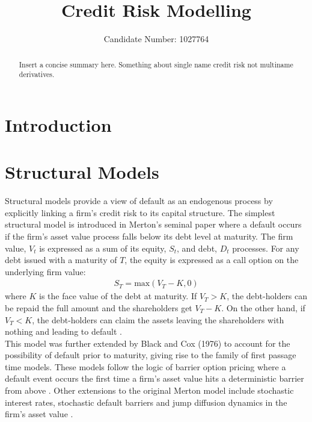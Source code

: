 \documentclass[11t,a4paper]{article}
\title{Credit Risk Modelling}
\author{Candidate Number: 1027764}
\begin{document}
\maketitle

\thispagestyle{empty}

\newpage
\tableofcontents
\thispagestyle{empty}
\newpage

\begin{abstract}
  Insert a concise summary here. Something about single name credit risk not multiname derivatives.
\end{abstract}
\newpage
\setcounter{page}{1}

\section{Introduction}
\section{Structural Models}
Structural models provide a view of default as an endogenous process by explicitly linking a firm's credit risk to its capital structure. The simplest structural model is introduced in Merton's seminal paper where a default occurs if the firm's asset value process falls below its debt level at maturity. The firm value, $V_t$ is expressed as a sum of its equity, $S_t$, and debt, $D_t$ processes. For any debt issued with a maturity of $T$, the equity is expressed as a call option on the underlying firm value:
\begin{align}
    S_T = \text{max}(V_T - K, 0)
\end{align}
where $K$ is the face value of the debt at maturity. If $V_T > K$, the debt-holders can be repaid the full amount and the shareholders get $V_T-K$. On the other hand, if $V_T<K$, the debt-holders can claim the assets leaving the shareholders with nothing and leading to default \cite{merton}. \\   
 This model was further extended by Black and Cox (1976) to account for the possibility of default prior to maturity, giving rise to the family of first passage time models. These models follow the logic of barrier option pricing where a default event occurs the first time a firm's asset value hits a deterministic barrier from above \cite{Brigobook}. Other extensions to the original Merton model include stochastic interest rates, stochastic default barriers and jump diffusion dynamics in the firm's asset value \cite{levycg}.
\end{document}
